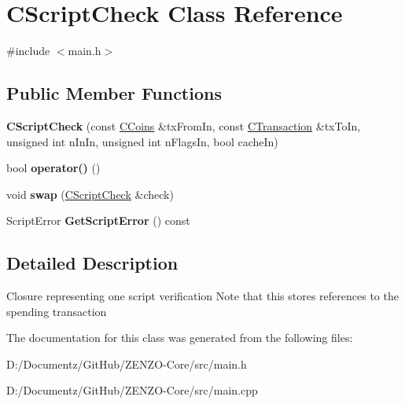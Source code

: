 \hypertarget{class_c_script_check}{}\section{C\+Script\+Check Class Reference}
\label{class_c_script_check}


{\ttfamily \#include $<$main.\+h$>$}

\subsection*{Public Member Functions}
\begin{DoxyCompactItemize}
\item 
\mbox{\label{class_c_script_check_a2617b99b66cd1de327478b74d8441c76}} 
{\bfseries C\+Script\+Check} (const \mbox{\hyperlink{class_c_coins}{C\+Coins}} \&tx\+From\+In, const \mbox{\hyperlink{class_c_transaction}{C\+Transaction}} \&tx\+To\+In, unsigned int n\+In\+In, unsigned int n\+Flags\+In, bool cache\+In)
\item 
\mbox{\label{class_c_script_check_a108d4c713338308be3867ed4e65b80c5}} 
bool {\bfseries operator()} ()
\item 
\mbox{\label{class_c_script_check_a69fbde608ff29c1885b8b9caf0fd40a0}} 
void {\bfseries swap} (\mbox{\hyperlink{class_c_script_check}{C\+Script\+Check}} \&check)
\item 
\mbox{\label{class_c_script_check_a1340496c37e521c253606b5957173afd}} 
Script\+Error {\bfseries Get\+Script\+Error} () const
\end{DoxyCompactItemize}


\subsection{Detailed Description}
Closure representing one script verification Note that this stores references to the spending transaction 

The documentation for this class was generated from the following files\+:\begin{DoxyCompactItemize}
\item 
D\+:/\+Documentz/\+Git\+Hub/\+Z\+E\+N\+Z\+O-\/\+Core/src/main.\+h\item 
D\+:/\+Documentz/\+Git\+Hub/\+Z\+E\+N\+Z\+O-\/\+Core/src/main.\+cpp\end{DoxyCompactItemize}
